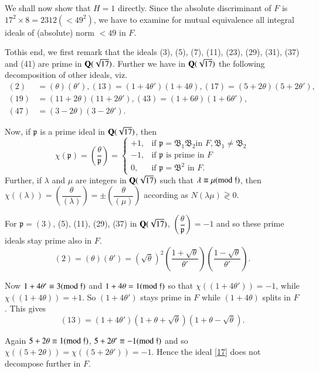 We shall now show that $H=1$ directly. Since the absolute discriminant
of $F$ is $17^{2}\times 8=2312(<49^{2})$, we have to examine for
mutual equivalence all integral ideals of (absolute) norm $<49$ in
$F$.

To\pageoriginale this end, we first remark that the ideals (3), (5),
(7), (11), (23), (29), (31), (37) and (41) are prime in
$\mathbf{Q}(\sqrt{17})$. Further we have in $\mathbf{Q}(\sqrt{17})$ the following
decomposition of other ideals, viz.
\begin{align*}
(2) &=
  (\theta)(\theta'),(13)=(1+4\theta')(1+4\theta),(17)=(5+2\theta)(5+2\theta'),\\
(19) &= (11+2\theta)(11+2\theta'),(43)=(1+6\theta)(1+6\theta'),\\
(47) &= (3-2\theta)(3-2\theta').
\end{align*}

Now, if $\mathfrak{p}$ is a prime ideal in $\mathbf{Q}(\sqrt{17})$, then
$$
\chi(\mathfrak{p})=\left(\frac{\theta}{\mathfrak{p}}\right)=
\begin{cases}
+1, & \text{if } \mathfrak{p}=\mathfrak{B}_{1}\mathfrak{B}_{2}\text{
  in } F,\mathfrak{B}_{1}\neq \mathfrak{B}_{2}\\
-1, & \text{if } \mathfrak{p}\text{ is prime in } F\\
0, & \text{if } \mathfrak{p}=\mathfrak{B}^{2}\text{ in }F.
\end{cases}
$$
Further, if $\lambda$ and $\mu$ are integers in $\mathbf{Q}(\sqrt{17})$ such
that $\lambda\equiv \mu(\rm{mod} \;\mathfrak{f})$, then
$\chi((\lambda))=\left(\dfrac{\theta}{(\lambda)}\right)=\pm
\left(\dfrac{\theta}{(\mu)}\right)$ according as
$N(\lambda\mu)\gtrless 0$.

For $\mathfrak{p}=(3)$, (5), (11), (29), (37) in $\mathbf{Q}(\sqrt{17})$,
$\left(\dfrac{\theta}{\mathfrak{p}}\right)=-1$ and so these prime
ideals stay prime also in $F$.
$$
(2)=(\theta)(\theta')=(\sqrt{\theta})^{2}\left(\frac{1+\sqrt{\theta}}{\theta'}\right)\left(\frac{1-\sqrt{\theta}}{\theta'}\right).
$$

Now $1+4\theta'\equiv 3(\rm{mod} \;\mathfrak{f})$ and
$1+4\theta=1(\rm{mod} \;\mathfrak{f})$ so that $\chi((1+4\theta'))=-1$, while
$\chi((1+4\theta))=+1$. So $(1+4\theta')$ stays prime in $F$ while
$(1+4\theta)$ splits in $F$. This gives
$$
(13)=(1+4\theta')(1+\theta+\sqrt{\theta})(1+\theta-\sqrt{\theta}).
$$

Again $5+2\theta\equiv 1(\rm{mod} \;\mathfrak{f})$, $5+2\theta'\equiv
-1(\rm{mod} \;\mathfrak{f})$ and so
$\chi((5+2\theta))=\chi((5+2\theta'))=-1$. Hence the ideal \eqref{17}
does not decompose further in $F$.

